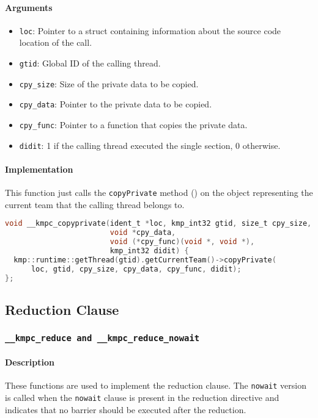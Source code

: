 \paragraph{Arguments}
\begin{itemize}
	\item \texttt{loc}: Pointer to a struct containing information about the source code location
	      of the call.
	\item \texttt{gtid}: Global ID of the calling thread.
	\item \texttt{cpy\_size}: Size of the private data to be copied.
	\item \texttt{cpy\_data}: Pointer to the private data to be copied.
	\item \texttt{cpy\_func}: Pointer to a function that copies the private data.
	\item \texttt{didit}: 1 if the calling thread executed the single section, 0 otherwise.
\end{itemize}

\paragraph{Implementation} This function just calls the \texttt{copyPrivate} method () on
the object representing the current team that the calling thread belongs to.

\begin{lstlisting}[language=C, caption={__kmpc_copyprivate},
                   label={lst:kmpc-copyprivate}, escapechar=@]
void __kmpc_copyprivate(ident_t *loc, kmp_int32 gtid, size_t cpy_size,
                        void *cpy_data,
                        void (*cpy_func)(void *, void *),
                        kmp_int32 didit) {
  kmp::runtime::getThread(gtid).getCurrentTeam()->copyPrivate(
      loc, gtid, cpy_size, cpy_data, cpy_func, didit);
};
\end{lstlisting}

\subsection{Reduction Clause}

\subsubsection{\texttt{__kmpc_reduce and __kmpc_reduce_nowait}}

\paragraph{Description} These functions are used to implement the reduction clause. The
\texttt{nowait} version is called when the \texttt{nowait} clause is present in the reduction
directive and indicates that no barrier should be executed after the reduction.

